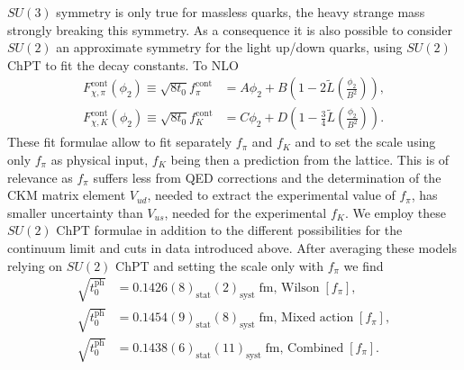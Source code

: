 $SU(3)$ symmetry is only true for massless quarks, the heavy strange mass strongly breaking this symmetry. As a consequence it is also possible to consider $SU(2)$ an approximate symmetry for the light up/down quarks, using $SU(2)$ ChPT to fit the decay constants. To NLO~\citep{SU2}
\begin{align}
\label{ch_ss:eq:SU2pi}
F_{\chi,\pi}^{\textrm{cont}}(\phi_2)\equiv\sqrt{8t_0}f_{\pi}^{\textrm{cont}}&=A\phi_2+B\left(1-2\tilde{L}\left(\frac{\phi_2}{B^2}\right)\right),\\
\label{ch_ss:eq:SU2k}
F_{\chi,K}^{\textrm{cont}}(\phi_2)\equiv\sqrt{8t_0}f_K^{\textrm{cont}}&=C\phi_2+D\left(1-\frac{3}{4}\tilde{L}\left(\frac{\phi_2}{B^2}\right)\right).
\end{align}
These fit formulae allow to fit separately $f_{\pi}$ and $f_K$ and to set the scale using only $f_{\pi}$ as physical input, $f_K$ being then a prediction from the lattice. This is of relevance as $f_{\pi}$ suffers less from QED corrections and the determination of the CKM matrix element $V_{ud}$, needed to extract the experimental value of $f_{\pi}$, has smaller uncertainty than $V_{us}$, needed for the experimental $f_K$. We employ these $SU(2)$ ChPT formulae in addition to the different possibilities for the continuum limit and cuts in data introduced above. After averaging these models relying on $SU(2)$ ChPT and setting the scale only with $f_{\pi}$ we find
\begin{align}
\label{ch_ss:eq:t0ph_fpi}
\sqrt{t_0^{\textrm{ph}}}&=0.1426(8)_{\textrm{stat}}(2)_{\textrm{syst}}\;\textrm{fm, Wilson}\;[f_{\pi}], \\
\sqrt{t_0^{\textrm{ph}}}&=0.1454(9)_{\textrm{stat}}(8)_{\textrm{syst}}\;\textrm{fm, Mixed action}\;[f_{\pi}], \\
\sqrt{t_0^{\textrm{ph}}}&=0.1438(6)_{\textrm{stat}}(11)_{\textrm{syst}}\;\textrm{fm, Combined}\;[f_{\pi}].
\end{align}
